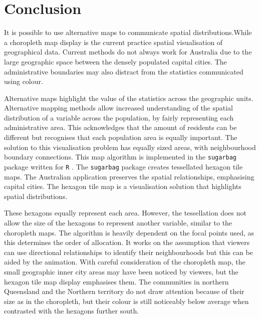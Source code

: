 \documentclass{monashthesis}
\begin{document}
\hypertarget{conclusion-03}{%
\section{Conclusion}\label{conclusion-03}}

It is possible to use alternative maps to communicate spatial distributions.While a choropleth map display is the current practice spatial visualisation of geographical data. Current methods do not always work for Australia due to the large geographic space between the densely populated capital cities. The administrative boundaries may also distract from the statistics communicated using colour.

Alternative maps highlight the value of the statistics across the geographic units. Alternative mapping methods allow increased understanding of the spatial distribution of a variable across the population, by fairly representing each administrative area. This acknowledges that the amount of residents can be different but recognises that each population area is equally important. The solution to this visualisation problem has equally sized areas, with neighbourhood boundary connections. This map algorithm is implemented in the \texttt{sugarbag} \autocite{sugarbag} package written for \texttt{R} \autocite{R}.
The \texttt{sugarbag} package creates tessellated hexagon tile maps. The Australian application preserves the spatial relationships, emphasising capital cities. The hexagon tile map is a visualisation solution that highlights spatial distributions.

These hexagons equally represent each area. However, the tessellation does not allow the size of the hexagons to represent another variable, similar to the choropleth maps.
The algorithm is heavily dependent on the focal points used, as this determines the order of allocation. It works on the assumption that viewers can use directional relationships to identify their neighbourhoods but this can be aided by the animation.
With careful consideration of the choropleth map, the small geographic inner city areas may have been noticed by viewers, but the hexagon tile map display emphasises them. The communities in northern Queensland and the Northern territory do not draw attention because of their size as in the choropleth, but their colour is still noticeably below average when contrasted with the hexagons further south.
\end{document}
